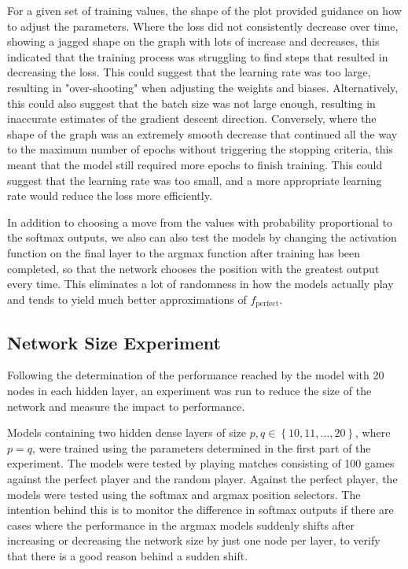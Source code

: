 \documentclass{somasmsc}
\begin{document}
For a given set of training values, the shape of the plot provided guidance on how to adjust the parameters. Where the loss did not consistently decrease over time, showing a jagged shape on the graph with lots of increase and decreases, this indicated that the training process was struggling to find steps that resulted in decreasing the loss. This could suggest that the learning rate was too large, resulting in "over-shooting" when adjusting the weights and biases. Alternatively, this could also suggest that the batch size was not large enough, resulting in inaccurate estimates of the gradient descent direction. Conversely, where the shape of the graph was an extremely smooth decrease that continued all the way to the maximum number of epochs without triggering the stopping criteria, this meant that the model still required more epochs to finish training. This could suggest that the learning rate was too small, and a more appropriate learning rate would reduce the loss more efficiently.

In addition to choosing a move from the values with probability proportional to the softmax outputs, we also can also test the models by changing the activation function on the final layer to the argmax function after training has been completed, so that the network chooses the position with the greatest output every time. This eliminates a lot of randomness in how the models actually play and tends to yield much better approximations of $f_{\text{perfect}}$.

\subsection{Network Size Experiment}\label{ox:dense_ex}

Following the determination of the performance reached by the model with 20 nodes in each hidden layer, an experiment was run to reduce the size of the network and measure the impact to performance.

Models containing two hidden dense layers of size $p,q \in \left\{10, 11, \dots, 20\right\}$, where $p=q$, were trained using the parameters determined in the first part of the experiment. The models were tested by playing matches consisting of 100 games against the perfect player and the random player. Against the perfect player, the models were tested using the softmax and argmax position selectors. The intention behind this is to monitor the difference in softmax outputs if there are cases where the performance in the argmax models suddenly shifts after increasing or decreasing the network size by just one node per layer, to verify that there is a good reason behind a sudden shift.
\end{document}
